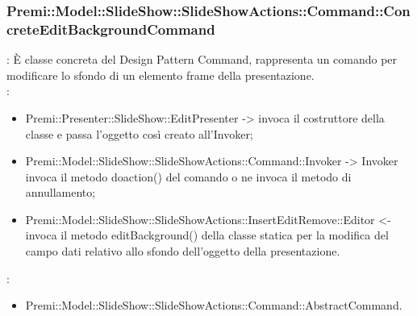 {                     \subsubsection{Premi::Model::SlideShow::SlideShowActions::Command::ConcreteEditBackgroundCommand}{
				\textbf{\tipo}: È classe concreta del Design Pattern Command, rappresenta un comando per modificare lo sfondo di un elemento frame della presentazione.\\	
				\textbf{\relaz}: 
				\begin{itemize}
					\item Premi::Presenter::SlideShow::EditPresenter -> invoca il costruttore della classe e passa l’oggetto così creato all’Invoker;
					\item Premi::Model::SlideShow::SlideShowActions::Command::Invoker -> Invoker invoca il metodo doaction() del comando o ne invoca il metodo di annullamento;
                    \item Premi::Model::SlideShow::SlideShowActions::InsertEditRemove::Editor <- invoca il metodo editBackground() della classe statica per la modifica del campo dati relativo allo sfondo dell'oggetto della presentazione.
				\end{itemize}	
                \textbf{\base}: 
                    \begin{itemize}
                    \item Premi::Model::SlideShow::SlideShowActions::Command::AbstractCommand.
                    \end{itemize}
                    }
}
